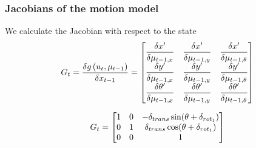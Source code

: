 \begin{frame}
    \frametitle{Jacobians of the motion model}
    We calculate the Jacobian with respect to the state
    \begin{equation*}
    G_{t} = \dfrac{\delta g\left( u_{t},\mu _{t-1} \right)}{\delta x _{t-1}} =
    \begin{bmatrix}
    \dfrac{\delta x^{\prime}}{\delta \mu _{t-1,x}} & \dfrac{\delta x^{\prime}}{\delta \mu _{t-1,y}} & \dfrac{\delta x^{\prime}}{\delta \mu _{t-1,\theta}}\\
    \dfrac{\delta y^{\prime}}{\delta \mu _{t-1,x}} & \dfrac{\delta y^{\prime}}{\delta \mu _{t-1,y}} & \dfrac{\delta y^{\prime}}{\delta \mu _{t-1,\theta}}\\
    \dfrac{\delta \theta^{\prime}}{\delta \mu _{t-1,x}} & \dfrac{\delta \theta^{\prime}}{\delta \mu _{t-1,y}} & \dfrac{\delta \theta^{\prime}}{\delta \mu _{t-1,\theta}}\\
    \end{bmatrix}
    \end{equation*}
   
    \begin{equation*}
    G_{t} =
    \begin{bmatrix}
    1 & 0 & -\delta_{trans} \sin(\theta + \delta_{rot_{1}})\\
    0 & 1 & \delta_{trans} \cos(\theta + \delta_{rot_{1}})\\
    0 & 0 & 1\\
    \end{bmatrix}
    \end{equation*}
\end{frame}

